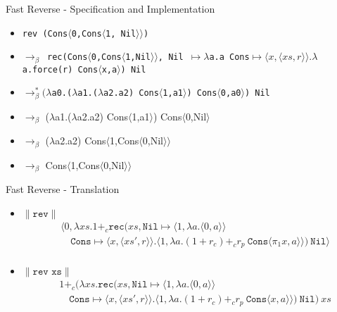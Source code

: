 \documentclass[pdf]{beamer}
\newcommand{\T}[1]{\texttt{#1}}
\newcommand{\LP}{\langle}
\newcommand{\RP}{\rangle}
\begin{document}
\begin{frame}{Fast Reverse - Specification and Implementation}
  \begin{itemize}
    \item
      \T{rev (Cons$\LP$0,Cons$\LP$1, Nil$\RP\RP$)}
    \item
    \T{$\to_\beta$
      rec(Cons$\LP$0,Cons$\LP$1,Nil$\RP\RP$,
          Nil $\mapsto\lambda$a.a
          Cons$\mapsto \LP x,\LP xs,r\RP\RP.\lambda$a.force(r) Cons$\LP$x,a$\RP$) Nil}
    \item
      \T{$\to^*_\beta (\lambda$a0.($\lambda$a1.($\lambda$a2.a2) Cons$\LP$1,a1$\RP$) Cons$\LP$0,a0$\RP$) Nil}
    \item
      $\to_\beta$ ($\lambda$a1.($\lambda$a2.a2) Cons$\LP$1,a1$\RP$) Cons$\LP$0,Nil$\RP$
    \item
      $\to_\beta$ ($\lambda$a2.a2) Cons$\LP$1,Cons$\LP$0,Nil$\RP\RP$
    \item
      $\to_\beta$ Cons$\LP$1,Cons$\LP$0,Nil$\RP\RP$
  \end{itemize}
\end{frame}

\begin{frame}{Fast Reverse - Translation}
  \small
  \begin{itemize}
    \item $\|\T{rev}\|$
      \begin{align*}
       &\LP 0, \lambda xs. 1 +_c \T{rec}(xs, \T{Nil} \mapsto \LP 1, \lambda a. \LP 0,a \RP\RP \\
      &\quad \T{Cons}\mapsto \LP x, \LP xs', r\RP\RP.\LP 1, \lambda a.(1 + r_c) +_c r_p\ \T{Cons}\LP \pi_1 x, a \RP\RP)\ \T{Nil}\RP\\
      \end{align*}
    \item $\|\T{rev xs}\|$
    \begin{align*}
      &1 +_c (\lambda xs.\T{rec}(xs, \T{Nil} \mapsto \LP 1, \lambda a. \LP 0, a \RP \RP \\
  &\quad \T{Cons}\mapsto \LP x, \LP xs', r\RP\RP. \LP 1, \lambda a.(1 + r_c) +_c r_p\ \T{Cons}\LP x, a \RP \RP)\ \T{Nil})\ xs
    \end{align*}
  \end{itemize}
\end{frame}
\end{document}
